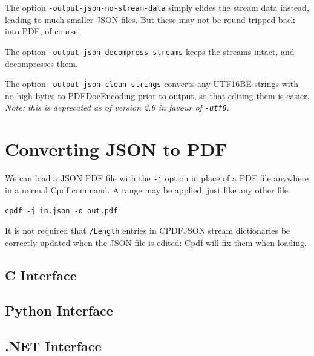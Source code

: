 \documentclass{book}
\begin{document}
\noindent The option \texttt{-output-json-no-stream-data} simply elides the stream data instead, leading to much smaller JSON files. But these may not be round-tripped back into PDF, of course.

The option \texttt{-output-json-decompress-streams} keeps the streams intact, and decompresses them.

The option \texttt{-output-json-clean-strings} converts any UTF16BE strings with no high bytes to PDFDocEncoding prior to output, so that editing them is easier. \textit{Note: this is deprecated as of version 2.6 in favour of \texttt{\textup{-utf8}}}.

\section{Converting JSON to PDF}

We can load a JSON PDF file with the \texttt{-j} option in place of a PDF file anywhere in a normal Cpdf command. A range may be applied, just like any other file. 

  \begin{framed}
  \small\noindent\verb!cpdf -j in.json -o out.pdf!
  \end{framed}

\noindent It is not required that \texttt{/Length} entries in CPDFJSON stream dictionaries be correctly updated when the JSON file is edited: Cpdf will fix them when loading.

\begin{cpdflib}
\clearpage
\section*{C Interface}
\begin{small}\tt

\end{small}
\end{cpdflib}

\begin{pycpdflib}
\clearpage
\section*{Python Interface}
\begin{small}\tt

\end{small}
\end{pycpdflib}

\begin{dotnetcpdflib}
\clearpage
\section*{.NET Interface}
\begin{small}\tt

\end{small}
\end{dotnetcpdflib}
\end{document}
